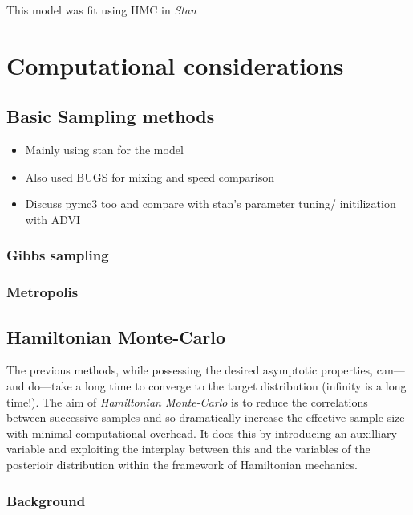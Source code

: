 \documentclass{article}
\begin{document}
This model was fit using HMC in \emph{Stan} 


\section{Computational considerations}

\subsection{Basic Sampling methods}

\begin{itemize}

\item Mainly using stan for the model

\item Also used BUGS for mixing and speed comparison

\item Discuss pymc3 too and compare with stan's parameter tuning/ initilization with ADVI

\end{itemize}

\subsubsection{Gibbs sampling}

\subsubsection{Metropolis}

\subsection{Hamiltonian Monte-Carlo}

The previous methods, while possessing the desired asymptotic properties, can---and do---take a long time to converge to the target distribution (infinity is a long time!). The aim of \emph{Hamiltonian Monte-Carlo} is to reduce the correlations between successive samples and so dramatically increase the effective sample size with minimal computational overhead. It does this by introducing an auxilliary variable and exploiting the interplay between this and the variables of the posterioir distribution within the framework of Hamiltonian mechanics.

\subsubsection{Background}
\end{document}
